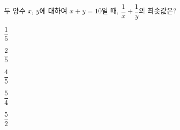 두 양수 $x$, $y$에 대하여 $x+y=10$일 때, $\dfrac{1}{x}+\dfrac{1}{y}$의 최솟값은?
\begin{choices32}{\rule[-3ex]{0pt}{8ex}$\dfrac{1}{5}$}{\rule[-3ex]{0pt}{8ex}$\dfrac{2}{5}$}{\rule[-3ex]{0pt}{8ex}$\dfrac{4}{5}$}{\rule[-3ex]{0pt}{8ex}$\dfrac{5}{4}$}{\rule[-3ex]{0pt}{8ex}$\dfrac{5}{2}$}\end{choices32}
